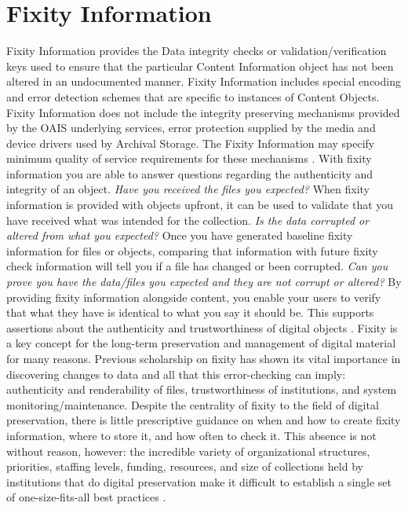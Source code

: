 \section{Fixity Information}
Fixity Information provides the Data integrity checks or validation/verification keys used to ensure that the particular Content Information object has not been altered in an undocumented manner. Fixity Information includes special encoding and error detection schemes that are specific to instances of Content Objects. Fixity Information does not include the integrity preserving mechanisms provided by the OAIS underlying services, error protection supplied by the media and device drivers used by Archival Storage. The Fixity Information may specify minimum quality of service requirements for these mechanisms \cite[4-30]{ccsds2012oais}.
With fixity information you are able to answer questions regarding the authenticity and integrity of an object.
\textit{Have you received the files you expected?} When fixity information is provided with objects upfront, it can be used to validate that you have received what was intended for the collection.
\textit{Is the data corrupted or altered from what you expected?}  Once you have generated baseline fixity information for files or objects, comparing that information with future fixity check information will tell you if a file has changed or been corrupted.
\textit{Can you prove you have the data/files you expected and they are not corrupt or altered?} By providing fixity information alongside content, you enable your users to verify that what they have is identical to what you say it should be. This supports assertions about the authenticity and trustworthiness of digital objects \cite[3]{ndsa2017fixity}.
Fixity is a key concept for the long-term preservation and management of digital material for many reasons. Previous scholarship on fixity has shown its vital importance in discovering changes to data and all that this error-checking can imply: authenticity and renderability of files, trustworthiness of institutions, and system monitoring/maintenance. Despite the centrality of fixity to the field of digital preservation, there is little prescriptive guidance on when and how to create fixity information, where to store it, and how often to check it. This absence is not without reason, however: the incredible variety of organizational structures, priorities, staffing levels, funding, resources, and size of collections held by institutions that do digital preservation make it difficult to establish a single set of one-size-fits-all best practices \cite[38]{ndsa2017fixity}.
